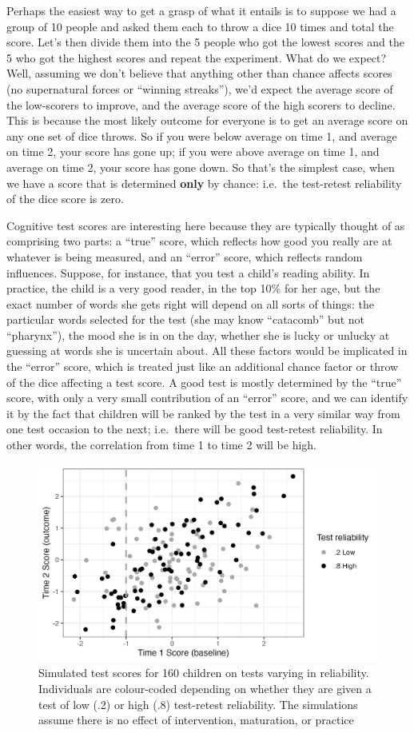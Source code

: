 \documentclass{krantz}
\begin{document}
Perhaps the easiest way to get a grasp of what it entails is to suppose we had a group of 10 people and asked them each to throw a dice 10 times and total the score. Let's then divide them into the 5 people who got the lowest scores and the 5 who got the highest scores and repeat the experiment. What do we expect? Well, assuming we don't believe that anything other than chance affects scores (no supernatural forces or ``winning streaks''), we'd expect the average score of the low-scorers to improve, and the average score of the high scorers to decline. This is because the most likely outcome for everyone is to get an average score on any one set of dice throws. So if you were below average on time 1, and average on time 2, your score has gone up; if you were above average on time 1, and average on time 2, your score has gone down. So that's the simplest case, when we have a score that is determined \textbf{only} by chance: i.e.~the test-retest reliability of the dice score is zero.

Cognitive test scores are interesting here because they are typically thought of as comprising two parts: a ``true'' score, which reflects how good you really are at whatever is being measured, and an ``error'' score, which reflects random influences. Suppose, for instance, that you test a child's reading ability. In practice, the child is a very good reader, in the top 10\% for her age, but the exact number of words she gets right will depend on all sorts of things: the particular words selected for the test (she may know ``catacomb'' but not ``pharynx''), the mood she is in on the day, whether she is lucky or unlucky at guessing at words she is uncertain about. All these factors would be implicated in the ``error'' score, which is treated just like an additional chance factor or throw of the dice affecting a test score. A good test is mostly determined by the ``true'' score, with only a very small contribution of an ``error'' score, and we can identify it by the fact that children will be ranked by the test in a very similar way from one test occasion to the next; i.e.~there will be good test-retest reliability. In other words, the correlation from time 1 to time 2 will be high.

\begin{figure}
\includegraphics[width=0.75\linewidth]{images_bw/reg2mean} \caption{Simulated test scores for 160 children on tests varying in reliability. Individuals are colour-coded depending on whether they are given a test of low (.2) or high (.8) test-retest reliability. The simulations assume there is no effect of intervention, maturation, or practice}\label{fig:reg2mean}
\end{figure}
\end{document}
